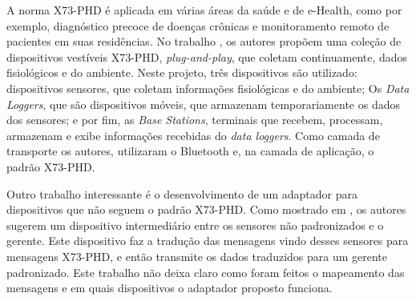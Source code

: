 A norma X73-PHD é aplicada em várias áreas da saúde e de e-Health, como por exemplo, diagnóstico precoce de doenças crônicas e  monitoramento remoto de pacientes em suas residências. No trabalho \cite{b22}, os autores propõem uma coleção de dispositivos vestíveis X73-PHD, \textit{plug-and-play}, que coletam continuamente, dados fisiológicos e do ambiente. Neste projeto, três dispositivos são utilizado: dispositivos sensores, que coletam informações fisiológicas e do ambiente; Os \textit{Data Loggers}, que são dispositivos móveis, que armazenam temporariamente os dados dos sensores; e por fim, as \textit{Base Stations}, terminais que recebem, processam, armazenam e exibe informações recebidas do \textit{data loggers}. Como camada de transporte os autores, utilizaram o Bluetooth e, na camada de aplicação, o padrão X73-PHD.  

Outro trabalho interessante é o desenvolvimento de um adaptador para dispositivos que não seguem o padrão X73-PHD. Como mostrado em \cite{b23}, os autores sugerem um dispositivo intermediário entre os sensores não padronizados e o gerente. Este dispositivo faz a tradução das mensagens vindo desses sensores para mensagens X73-PHD, e então transmite os dados traduzidos para um gerente padronizado. Este trabalho não deixa claro como foram feitos o mapeamento das mensagens e em quais dispositivos o adaptador proposto funciona. 

